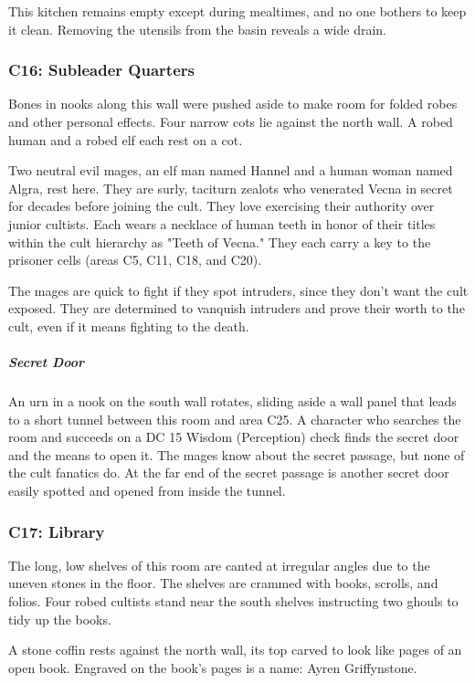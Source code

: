 \documentclass[10pt,a4paper,twoside,bg=print,twocolumn,openany,nodeprecatedcode]{dndbook}
\begin{document}
This kitchen remains empty except during mealtimes, and no one bothers to keep it clean. Removing the utensils from the basin reveals a wide drain.

\subsubsection{C16: Subleader Quarters}
\begin{DndReadAloud}{}
Bones in nooks along this wall were pushed aside to make room for folded robes and other personal effects. Four narrow cots lie against the north wall. A robed human and a robed elf each rest on a cot.

\end{DndReadAloud}

Two neutral evil mages, an elf man named Hannel and a human woman named Algra, rest here. They are surly, taciturn zealots who venerated Vecna in secret for decades before joining the cult. They love exercising their authority over junior cultists. Each wears a necklace of human teeth in honor of their titles within the cult hierarchy as "Teeth of Vecna." They each carry a key to the prisoner cells (areas C5, C11, C18, and C20).

The mages are quick to fight if they spot intruders, since they don't want the cult exposed. They are determined to vanquish intruders and prove their worth to the cult, even if it means fighting to the death.

\subparagraph{Secret Door}
An urn in a nook on the south wall rotates, sliding aside a wall panel that leads to a short tunnel between this room and area C25. A character who searches the room and succeeds on a DC 15 Wisdom (Perception) check finds the secret door and the means to open it. The mages know about the secret passage, but none of the cult fanatics do. At the far end of the secret passage is another secret door easily spotted and opened from inside the tunnel.

\subsubsection{C17: Library}
\begin{DndReadAloud}{}
The long, low shelves of this room are canted at irregular angles due to the uneven stones in the floor. The shelves are crammed with books, scrolls, and folios. Four robed cultists stand near the south shelves instructing two ghouls to tidy up the books.

A stone coffin rests against the north wall, its top carved to look like pages of an open book. Engraved on the book's pages is a name: Ayren Griffynstone.

\end{DndReadAloud}
\end{document}
